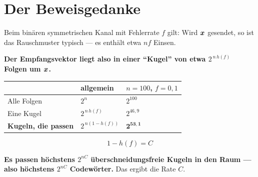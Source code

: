 \section{Der Beweisgedanke}

\begin{merksatz}
Beim binären symmetrischen Kanal mit Fehlerrate $f$ gilt: Wird $\boldsymbol{x}$ gesendet, so ist das Rauschmuster typisch --- es enthält etwa $nf$ Einsen.

\begin{center}
\begin{minipage}{0.9\textwidth}
\textbf{Der Empfangsvektor liegt also in einer \enquote{Kugel} von etwa $2^{\,n\,h(f)}$ Folgen um $\boldsymbol{x}$.}
\end{minipage}
\end{center}

\begin{center}
{\small
\renewcommand{\arraystretch}{1.5}
\begin{tabular}{@{}P{2.8cm}P{2.6cm}P{2.4cm}@{}}
\toprule
& \textbf{allgemein} & $n=100$, $f=0{,}1$\\
\midrule
Alle Folgen & $2^{n}$ & $2^{100}$\\
Eine Kugel & $2^{\,n\,h(f)}$ & $2^{46{,}9}$\\
\textbf{Kugeln, die passen} & $2^{\,n(1-h(f))}$ & $\mathbf{2^{53{,}1}}$\\
\bottomrule
\end{tabular}}
\end{center}

\[ 1-h(f) = C \]

\begin{center}
\begin{minipage}{0.9\textwidth}
\textbf{Es passen höchstens $2^{nC}$ überschneidungsfreie Kugeln in den Raum --- also höchstens $2^{nC}$ Codewörter.} Das ergibt die Rate $C$.
\end{minipage}
\end{center}

\begin{center}
\end{center}

\begin{center}
\begin{minipage}{0.88\textwidth}
\end{minipage}
\end{center}
\end{merksatz}

